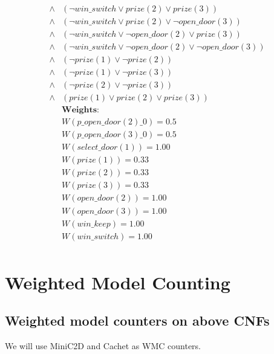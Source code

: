 \begin{align*}
    \land & (\neg win\_switch \lor prize(2) \lor prize(3))                            \\
    \land & (\neg win\_switch \lor prize(2) \lor \neg open\_door(3))                  \\
    \land & (\neg win\_switch \lor \neg open\_door(2) \lor prize(3))                  \\
    \land & (\neg win\_switch \lor \neg open\_door(2) \lor \neg open\_door(3))        \\
    \land & (\neg prize(1) \lor \neg prize(2))                                        \\
    \land & (\neg prize(1) \lor \neg prize(3))                                        \\
    \land & (\neg prize(2) \lor \neg prize(3))                                        \\
    \land & (prize(1) \lor prize(2) \lor prize(3))\\
    & \textbf{Weights:}             \\
    & W(p\_open\_door(2)\_0) = 0.5 \\
    & W(p\_open\_door(3)\_0) = 0.5 \\
    & W(select\_door(1)) = 1.00    \\
    & W(prize(1)) = 0.33           \\
    & W(prize(2)) = 0.33           \\
    & W(prize(3)) = 0.33           \\
    & W(open\_door(2)) = 1.00      \\
    & W(open\_door(3)) = 1.00      \\
    & W(win\_keep) = 1.00          \\
    & W(win\_switch) = 1.00        \\
\end{align*}


\section{Weighted Model Counting}
\subsection{Weighted model counters on above CNFs}
We will use MiniC2D and Cachet as WMC counters.

